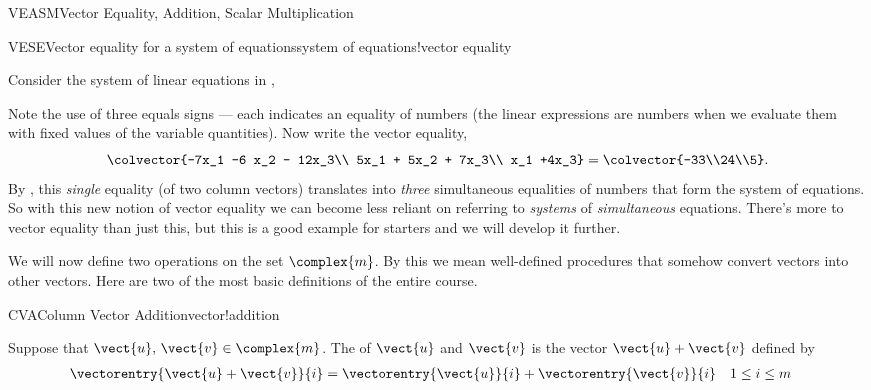 \begin{subsect}{VEASM}{Vector Equality, Addition, Scalar Multiplication}
\begin{example}{VESE}{Vector equality for a system of equations}{system of equations!vector equality}
\begin{para}Consider the system of linear equations in ,
%
%
\end{para}
%
\begin{para}Note the use of three equals signs --- each indicates an equality of numbers (the linear expressions are numbers when we evaluate them with fixed values of the variable quantities).  Now write the vector equality,
%
\begin{equation*}
\colvector{-7x_1 -6 x_2 - 12x_3\\ 5x_1  + 5x_2 + 7x_3\\ x_1 +4x_3}
=
\colvector{-33\\24\\5}.
\end{equation*}
%
By , this {\em single} equality (of two column vectors) translates into {\em three} simultaneous equalities of numbers that form the system of equations.  So with this new notion of vector equality we can become less reliant on referring to {\em systems} of {\em simultaneous} equations.  There's more to vector equality than just this, but this is a good example for starters and we will develop it further.\end{para}
\end{example}
%
\begin{para}We will now define two operations on the set $\complex{m}$.  By this we mean well-defined procedures that somehow convert vectors into other vectors.  Here are two of the most basic definitions of the entire course.\end{para}
%
\begin{definition}{CVA}{Column Vector Addition}{vector!addition}
\begin{para}Suppose that $\vect{u},\,\vect{v}\in\complex{m}$. The  of $\vect{u}$ and $\vect{v}$ is the vector $\vect{u}+\vect{v}$ defined by
%
\begin{align*}
\vectorentry{\vect{u}+\vect{v}}{i}
&=\vectorentry{\vect{u}}{i}+\vectorentry{\vect{v}}{i}
&&1\leq i\leq m
\end{align*}\end{para}
%
\end{definition}
%

\end{subsect}
